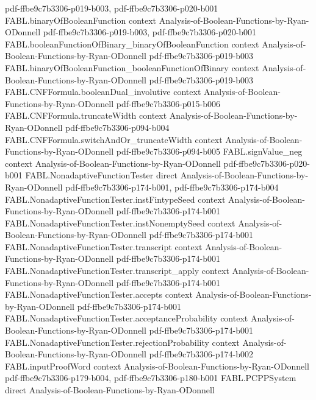 \begin{theorem}
  {pdf-ffbe9c7b3306-p019-b003,
    pdf-ffbe9c7b3306-p020-b001}
\proofstep
  {FABL.binaryOfBooleanFunction}
  {context}
  {Analysis-of-Boolean-Functions-by-Ryan-ODonnell}
  {pdf-ffbe9c7b3306-p019-b003,
    pdf-ffbe9c7b3306-p020-b001}
\proofstep
  {FABL.booleanFunctionOfBinary_binaryOfBooleanFunction}
  {context}
  {Analysis-of-Boolean-Functions-by-Ryan-ODonnell}
  {pdf-ffbe9c7b3306-p019-b003}
\proofstep
  {FABL.binaryOfBooleanFunction_booleanFunctionOfBinary}
  {context}
  {Analysis-of-Boolean-Functions-by-Ryan-ODonnell}
  {pdf-ffbe9c7b3306-p019-b003}
\proofstep
  {FABL.CNFFormula.booleanDual_involutive}
  {context}
  {Analysis-of-Boolean-Functions-by-Ryan-ODonnell}
  {pdf-ffbe9c7b3306-p015-b006}
\proofstep
  {FABL.CNFFormula.truncateWidth}
  {context}
  {Analysis-of-Boolean-Functions-by-Ryan-ODonnell}
  {pdf-ffbe9c7b3306-p094-b004}
\proofstep
  {FABL.CNFFormula.switchAndOr_truncateWidth}
  {context}
  {Analysis-of-Boolean-Functions-by-Ryan-ODonnell}
  {pdf-ffbe9c7b3306-p094-b005}
\proofstep
  {FABL.signValue_neg}
  {context}
  {Analysis-of-Boolean-Functions-by-Ryan-ODonnell}
  {pdf-ffbe9c7b3306-p020-b001}
\proofstep
  {FABL.NonadaptiveFunctionTester}
  {direct}
  {Analysis-of-Boolean-Functions-by-Ryan-ODonnell}
  {pdf-ffbe9c7b3306-p174-b001,
    pdf-ffbe9c7b3306-p174-b004}
\proofstep
  {FABL.NonadaptiveFunctionTester.instFintypeSeed}
  {context}
  {Analysis-of-Boolean-Functions-by-Ryan-ODonnell}
  {pdf-ffbe9c7b3306-p174-b001}
\proofstep
  {FABL.NonadaptiveFunctionTester.instNonemptySeed}
  {context}
  {Analysis-of-Boolean-Functions-by-Ryan-ODonnell}
  {pdf-ffbe9c7b3306-p174-b001}
\proofstep
  {FABL.NonadaptiveFunctionTester.transcript}
  {context}
  {Analysis-of-Boolean-Functions-by-Ryan-ODonnell}
  {pdf-ffbe9c7b3306-p174-b001}
\proofstep
  {FABL.NonadaptiveFunctionTester.transcript_apply}
  {context}
  {Analysis-of-Boolean-Functions-by-Ryan-ODonnell}
  {pdf-ffbe9c7b3306-p174-b001}
\proofstep
  {FABL.NonadaptiveFunctionTester.accepts}
  {context}
  {Analysis-of-Boolean-Functions-by-Ryan-ODonnell}
  {pdf-ffbe9c7b3306-p174-b001}
\proofstep
  {FABL.NonadaptiveFunctionTester.acceptanceProbability}
  {context}
  {Analysis-of-Boolean-Functions-by-Ryan-ODonnell}
  {pdf-ffbe9c7b3306-p174-b001}
\proofstep
  {FABL.NonadaptiveFunctionTester.rejectionProbability}
  {context}
  {Analysis-of-Boolean-Functions-by-Ryan-ODonnell}
  {pdf-ffbe9c7b3306-p174-b002}
\proofstep
  {FABL.inputProofWord}
  {context}
  {Analysis-of-Boolean-Functions-by-Ryan-ODonnell}
  {pdf-ffbe9c7b3306-p179-b004,
    pdf-ffbe9c7b3306-p180-b001}
\proofstep
  {FABL.PCPPSystem}
  {direct}
  {Analysis-of-Boolean-Functions-by-Ryan-ODonnell}

\end{theorem}
